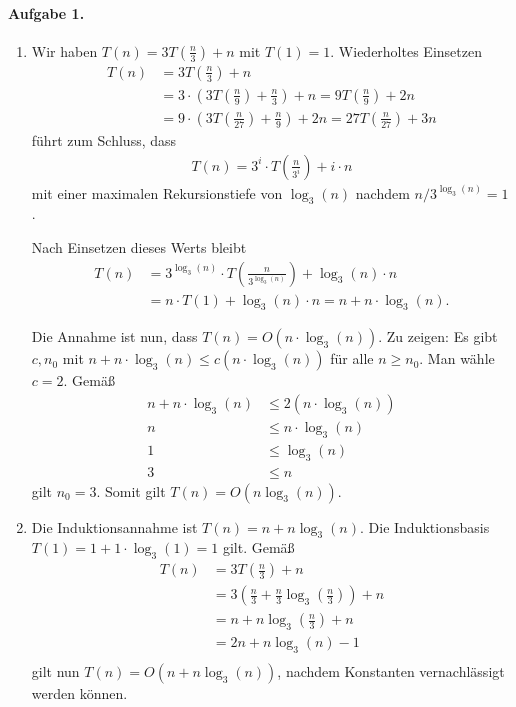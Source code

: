 \documentclass{article}
\begin{document}
\paragraph{Aufgabe 1.}

\begin{enumerate}
    \item Wir haben \(T(n) = 3T(\frac{n}{3}) + n\) mit \(T(1) = 1\). Wiederholtes Einsetzen
    \begin{align*}
        T(n) &= 3 T\left(\frac{n}{3}\right) + n \\
        &= 3 \cdot \left(3T\left(\frac{n}{9}\right) + \frac{n}{3}\right) + n =  9T\left(\frac{n}{9}\right) + 2n \\
        &= 9 \cdot \left(3T\left(\frac{n}{27}\right) + \frac{n}{9}\right) + 2n = 27T\left(\frac{n}{27}\right) + 3n
    \end{align*}
    führt zum Schluss, dass
    \begin{align*}
        T(n) = 3^i \cdot T\left(\frac{n}{3^i}\right) + i \cdot n
    \end{align*}
    mit einer maximalen Rekursionstiefe von \(\log_3(n)\) nachdem \(n / 3^{\log_3(n)} = 1\).

    Nach Einsetzen dieses Werts bleibt
    \begin{align*}
        T(n) &= 3^{\log_3(n)} \cdot T\left(\frac{n}{3^{\log_3(n)}}\right) + \log_3(n) \cdot n \\
        &= n \cdot T(1) + \log_3(n) \cdot n = n + n \cdot \log_3(n).
    \end{align*}

    Die Annahme ist nun, dass \(T(n) = O(n \cdot \log_3(n))\). Zu zeigen: Es gibt \(c, n_0\) mit \(n + n \cdot \log_3(n) \leq c(n \cdot \log_3(n))\) für alle \(n \geq n_0\). Man wähle \(c = 2\). Gemäß
    \begin{align*}
        n + n \cdot \log_3(n) &\leq 2(n \cdot \log_3(n)) \\
        n &\leq n \cdot \log_3(n) \\
        1 &\leq \log_3(n) \\
        3 &\leq n
    \end{align*}
    gilt \(n_0 = 3\). Somit gilt \(T(n) = O(n \log_3(n))\).

    \item Die Induktionsannahme ist \(T(n) = n + n\log_3(n)\). Die Induktionsbasis \(T(1) = 1 + 1 \cdot \log_3(1) = 1\) gilt. Gemäß
    \begin{align*}
        T(n) &= 3T\left(\frac{n}{3}\right) + n \\
        &= 3\left(\frac{n}{3} + \frac{n}{3}\log_3\left(\frac{n}{3}\right)\right) + n \\
        &= n + n \log_3\left(\frac{n}{3}\right) + n \\
        &= 2n + n \log_3(n) - 1 \\
    \end{align*}
    gilt nun $T(n) = O(n + n \log_3(n))$, nachdem Konstanten vernachlässigt werden können.
\end{enumerate}
\end{document}
